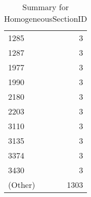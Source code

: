 \begin{table}[ht]
\begin{tabular}{lr}
  1285 &   3 \\ 
  1287 &   3 \\ 
  1977 &   3 \\ 
  1990 &   3 \\ 
  2180 &   3 \\ 
  2203 &   3 \\ 
  3110 &   3 \\ 
  3135 &   3 \\ 
  3374 &   3 \\ 
  3430 &   3 \\ 
  (Other) & 1303 \\ 
   \hline
\end{tabular}
\caption{Summary for HomogeneousSectionID} 
\label{tab: HomogeneousSectionID}
\end{table}

